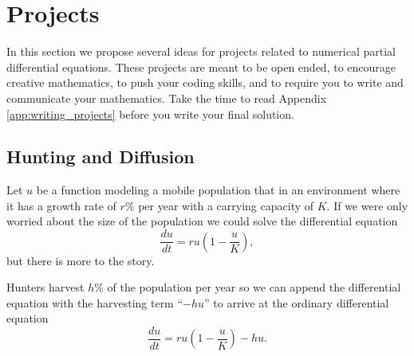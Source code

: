\newpage\section{Projects}
In this section we propose several ideas for projects related to numerical partial
differential equations.  These projects are meant to be open ended, to encourage creative
mathematics, to push your coding skills, and to require you to write and communicate your
mathematics.  Take the time to read Appendix \ref{app:writing_projects} before you write
your final solution.




\subsection{Hunting and Diffusion}
Let $u$ be a function modeling a mobile population that in an environment where it has a
growth rate of $r\%$ per year with a carrying capacity of $K$.  If we were only worried
about the size of the population we could solve the differential equation 
\[ \frac{du}{dt} = ru \left( 1-\frac{u}{K} \right), \]
but there is more to the story.  

Hunters harvest $h$\% of the population per year so we can append the differential
equation with the harvesting term ``$-h u$'' to arrive at the ordinary differential
equation 
\[ \frac{du}{dt} = ru \left( 1-\frac{u}{K} \right) - hu. \]

